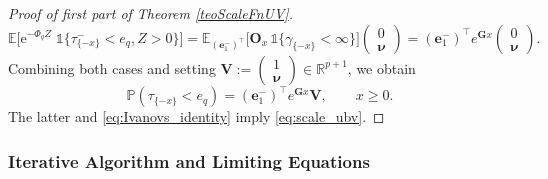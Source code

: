 \documentclass[a4paper,11pt]{article}
\numberwithin{equation}{section}
\theoremstyle{plain}
\theoremstyle{definition}
\newcommand{\1}{\mathbf{1}}
\newcommand{\e}{\mathrm{e}}
\newcommand{\PP}{\mathbb{P}}
\begin{document}
\begin{proof}[Proof of first part of Theorem \ref{teoScaleFnUV}]
\[
\mathbb{E}\Big[\e^{-\Phi_q Z}\;\mathds{1}\big\{\tau^-_{\{-x\}} < e_q,Z>0\big\}\Big] = \mathbb{E}_{(\bm{e}_1^-)^\intercal}\Big[\bm{O}_x\,\mathds{1}\{\gamma_{\{-x\}} < \infty\}\Big]\begin{pmatrix}0\\\bm{\nu}\end{pmatrix} = (\bm{e}_1^-)^\intercal e^{\bm{G}x}\begin{pmatrix}0\\\bm{\nu}\end{pmatrix}.
\]
Combining both cases and setting $\bm{V}:=\begin{pmatrix}1\\\bm{\nu}\end{pmatrix}\in\mathbb{R}^{p+1}$, we obtain
\begin{equation}\label{eq:hitting_ubv}
\PP(\tau_{\{-x\}} < e_q) = (\bm{e}_1^-)^\intercal e^{\bm{G}x}\bm{V}, \qquad x \ge 0.
\end{equation}
The latter and \eqref{eq:Ivanovs_identity} imply \eqref{eq:scale_ubv}.
\end{proof}




\subsubsection{Iterative Algorithm and Limiting Equations}
\end{document}

